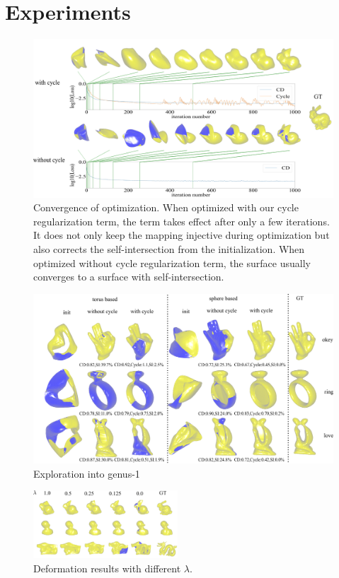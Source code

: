 \section{Experiments}
\begin{figure}[t]
	\centering
	\includegraphics[width=\linewidth]{img/opt/opt2}
	\caption{Convergence of optimization. When optimized with our cycle regularization term, the term takes effect after only a few iterations. It does not only keep the mapping injective during optimization but also corrects the self-intersection from the initialization. When optimized without cycle regularization term, the surface usually converges to a surface with self-intersection.}
	\label{fig:opt}
\end{figure}
\begin{figure}[t]
	\centering
	\includegraphics[width=\linewidth]{revision/img/torus/torus}
	\caption{Exploration into genus-1}
	\label{fig:torus}
\end{figure}
\begin{figure}
	\begin{center}
		\includegraphics[width=0.48\textwidth]{img/opt/lambda}
	\end{center}
	\caption{Deformation results with different $\lambda$.}
	\label{fig:lambda}
\end{figure}
